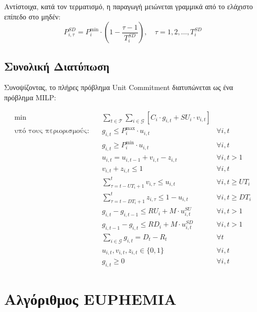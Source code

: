 Αντίστοιχα, κατά τον τερματισμό, η παραγωγή μειώνεται γραμμικά από το ελάχιστο επίπεδο στο μηδέν:
\begin{equation}
\label{eq:uc-shutdown-profile}
P_{i,\tau}^{SD} = P_i^{\min} \cdot \left(1 - \frac{\tau - 1}{T_i^{SD}}\right), \quad \tau = 1, 2, \ldots, T_i^{SD}
\end{equation}

\subsection{Συνολική Διατύπωση}
\label{subsec:uc-complete-formulation}

Συνοψίζοντας, το πλήρες πρόβλημα Unit Commitment διατυπώνεται ως ένα πρόβλημα MILP:

\begin{equation}
\label{eq:uc-complete}
\begin{aligned}
\min \quad & \sum_{t \in \mathcal{T}} \sum_{i \in \mathcal{G}} \left[ C_i \cdot g_{i,t} + SU_i \cdot v_{i,t} \right] \\
\text{υπό τους περιορισμούς:} \quad 
& g_{i,t} \leq P_i^{\max} \cdot u_{i,t} & \forall i, t \\
& g_{i,t} \geq P_i^{\min} \cdot u_{i,t} & \forall i, t \\
& u_{i,t} = u_{i,t-1} + v_{i,t} - z_{i,t} & \forall i, t > 1 \\
& v_{i,t} + z_{i,t} \leq 1 & \forall i, t \\
& \sum_{\tau = t - UT_i + 1}^{t} v_{i,\tau} \leq u_{i,t} & \forall i, t \geq UT_i \\
& \sum_{\tau = t - DT_i + 1}^{t} z_{i,\tau} \leq 1 - u_{i,t} & \forall i, t \geq DT_i \\
& g_{i,t} - g_{i,t-1} \leq RU_i + M \cdot u_{i,t}^{SU} & \forall i, t > 1 \\
& g_{i,t-1} - g_{i,t} \leq RD_i + M \cdot u_{i,t}^{SD} & \forall i, t > 1 \\
& \sum_{i \in \mathcal{G}} g_{i,t} = D_t - R_t & \forall t \\
& u_{i,t}, v_{i,t}, z_{i,t} \in \{0, 1\} & \forall i, t \\
& g_{i,t} \geq 0 & \forall i, t
\end{aligned}
\end{equation}


\section{Αλγόριθμος EUPHEMIA}
\label{sec:euphemia-algorithm}

